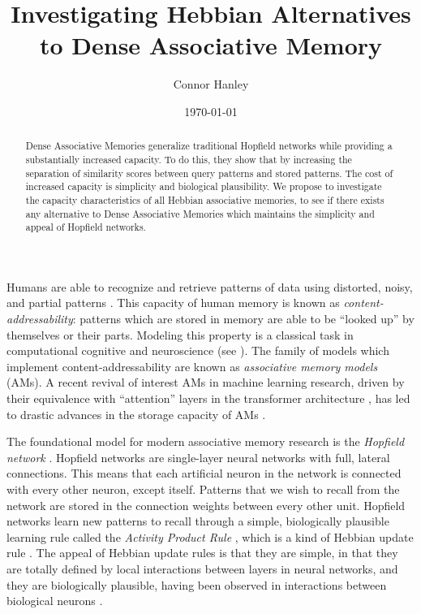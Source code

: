 \documentclass{article}
\title{Investigating Hebbian Alternatives to Dense Associative Memory}
\author{Connor Hanley}
\date{\today}
\theoremstyle{definition}
\begin{document}
\maketitle

\begin{abstract}
  Dense Associative Memories generalize traditional Hopfield networks
  while providing a substantially increased capacity. To do this,
  they show that by increasing the separation of similarity scores
  between query patterns and stored patterns. The cost of increased
  capacity is simplicity and biological plausibility. We propose
  to investigate the capacity characteristics of all Hebbian
  associative memories, to see if there exists any alternative to
  Dense Associative Memories which maintains the simplicity and
  appeal of Hopfield networks.
\end{abstract}

Humans are able to recognize and retrieve patterns of data using distorted,
noisy, and partial patterns \parencite{rumelhart_general_1986}. This
capacity of human memory is known as \textit{content-addressability}: patterns
which are stored in memory are able to be ``looked up'' by themselves or their
parts. Modeling this property is a classical task in computational cognitive
and neuroscience (see \textcites{marr_simple_1971,little_existence_1974,
amari_learning_1972,nakano_associatron-model_1972,stanley_simulation_1976}).
The family of models which implement content-addressability are known
as \textit{associative memory models} (AMs).
A recent revival of interest AMs in machine learning research,
driven by their equivalence with ``attention'' layers in the transformer
architecture \parencites{vaswani_attention_2023, ramsauer_hopfield_2021},
has led to drastic advances in the storage capacity of AMs
\parencites{demircigil_model_2017,krotov_dense_2016,hu_provably_2024}.

The foundational model for modern associative memory research is the
\textit{Hopfield network}
\parencites{hopfield_neural_1982,hopfield_neurons_1984}.
Hopfield networks are single-layer neural networks with full, lateral
connections.
This means that each artificial neuron in the network is connected with every
other neuron, except itself. Patterns that we wish to recall from the network
are stored in the connection weights between every other unit. Hopfield
networks learn new patterns to recall through a simple, biologically plausible
learning rule called the \textit{Activity Product Rule}
\parencite{haykin_neural_2009},
which is a kind of Hebbian update rule \parencite{hebb_organization_1949}.
The appeal of Hebbian update rules is that they are simple, in that they
are totally defined by local interactions between layers in neural networks,
and they are biologically plausible, having been observed in interactions
between biological neurons
\parencites{rolls_mechanisms_2013,bi_synaptic_1998,markram_regulation_1997}.
\end{document}
